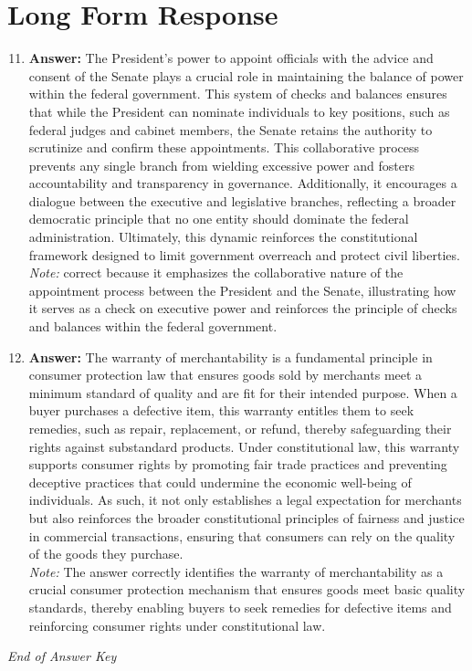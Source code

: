 \documentclass[12pt]{article}
\begin{document}
\section*{Long Form Response}
\begin{enumerate}[label=\arabic*.]
\setcounter{enumi}{10}
\item \textbf{Answer:} The President's power to appoint officials with the advice and consent of the Senate plays a crucial role in maintaining the balance of power within the federal government. This system of checks and balances ensures that while the President can nominate individuals to key positions, such as federal judges and cabinet members, the Senate retains the authority to scrutinize and confirm these appointments. This collaborative process prevents any single branch from wielding excessive power and fosters accountability and transparency in governance. Additionally, it encourages a dialogue between the executive and legislative branches, reflecting a broader democratic principle that no one entity should dominate the federal administration. Ultimately, this dynamic reinforces the constitutional framework designed to limit government overreach and protect civil liberties.
\\ \textit{Note:} correct because it emphasizes the collaborative nature of the appointment process between the President and the Senate, illustrating how it serves as a check on executive power and reinforces the principle of checks and balances within the federal government.
\item \textbf{Answer:} The warranty of merchantability is a fundamental principle in consumer protection law that ensures goods sold by merchants meet a minimum standard of quality and are fit for their intended purpose. When a buyer purchases a defective item, this warranty entitles them to seek remedies, such as repair, replacement, or refund, thereby safeguarding their rights against substandard products. Under constitutional law, this warranty supports consumer rights by promoting fair trade practices and preventing deceptive practices that could undermine the economic well-being of individuals. As such, it not only establishes a legal expectation for merchants but also reinforces the broader constitutional principles of fairness and justice in commercial transactions, ensuring that consumers can rely on the quality of the goods they purchase.
\\ \textit{Note:} The answer correctly identifies the warranty of merchantability as a crucial consumer protection mechanism that ensures goods meet basic quality standards, thereby enabling buyers to seek remedies for defective items and reinforcing consumer rights under constitutional law.
\end{enumerate}

\vfill
\noindent\textit{End of Answer Key}
\end{document}
